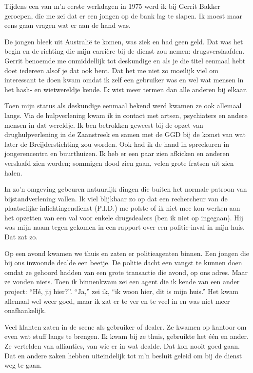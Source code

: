 \documentclass[12pt,twoside, openright]{memoir}
\begin{document}
Tijdens een van m’n eerste werkdagen in 1975 werd ik bij Gerrit Bakker geroepen, die me zei dat er een jongen op de bank lag te slapen. Ik moest maar eens gaan vragen wat er aan de hand was. 

De jongen bleek uit Australië te komen, was ziek en had geen geld. Dat was het begin en de richting die mijn carrière bij de dienst zou nemen: drugsverslaafden. Gerrit benoemde me onmiddellijk tot deskundige en als je die titel eenmaal hebt doet iedereen alsof je dat ook bent. Dat het me niet zo moeilijk viel om interessant te doen kwam omdat ik zelf een gebruiker was en wel wat mensen in het hash- en wietwereldje kende. Ik wist meer termen dan alle anderen bij elkaar. 

Toen mijn status als deskundige eenmaal bekend werd kwamen ze ook allemaal langs. Via de hulpverlening kwam ik in contact met artsen, psychiaters en andere mensen in dat wereldje. Ik ben betrokken geweest bij de opzet van drughulpverlening in de Zaanstreek en samen met de GGD bij de komst van wat later de Breijderstichting zou worden. Ook had ik de hand in spreekuren in jongerencentra en buurthuizen. Ik heb er een paar zien afkicken en anderen verslaafd zien worden; sommigen dood zien gaan, velen grote fratsen uit zien halen. 

In zo’n omgeving gebeuren natuurlijk dingen die buiten het normale patroon van bijstandverlening vallen. Ik viel blijkbaar zo op dat een rechercheur van de plaatselijke  inlichtingendienst (P.I.D.) me polste of ik niet mee kon werken aan het opzetten van een val voor enkele drugsdealers (ben ik niet op ingegaan). Hij was mijn naam tegen gekomen in een rapport over een politie-inval in mijn huis. Dat zat zo. 

Op een avond kwamen we thuis en zaten er politieagenten binnen. Een jongen die bij ons inwoonde dealde een beetje. De politie dacht een vangst te kunnen doen omdat ze gehoord hadden van een grote transactie die avond, op ons adres. Maar ze vonden niets. Toen ik binnenkwam zei een agent die ik kende van een ander project: ``Hé, jij hier?''. ``Ja,'' zei ik, ``ik woon hier, dit is mijn huis.'' Het kwam allemaal wel weer goed, maar ik zat er te ver en te veel in en was niet meer onafhankelijk. 

Veel klanten zaten in de scene als gebruiker of dealer. Ze kwamen op kantoor om even wat stuff langs te brengen. Ik kwam bij ze thuis, gebruikte het één en ander. Ze vertelden van allianties, van wie er in wat dealde. Dat kon nooit goed gaan. Dat en andere zaken hebben uiteindelijk tot m’n besluit geleid om bij de dienst weg te gaan. 
\end{document}
